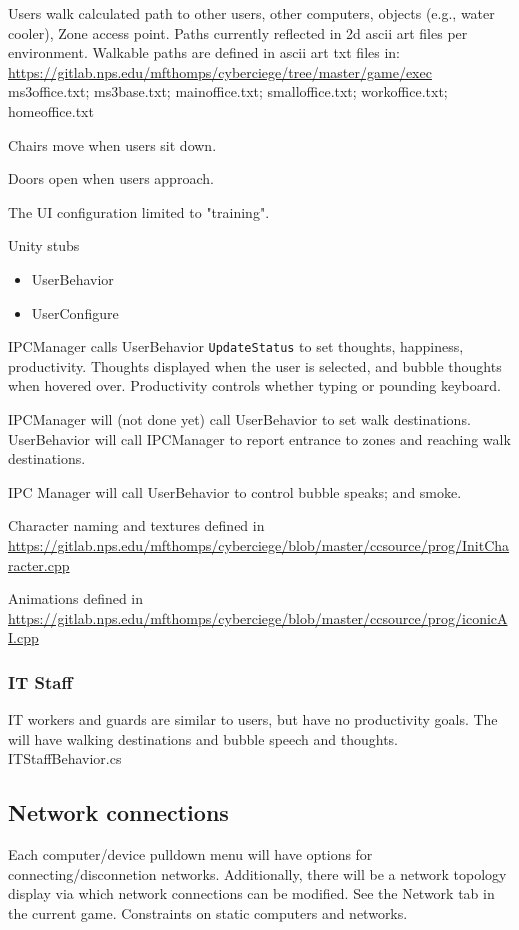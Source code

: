 \documentclass{article}
\begin{document}
Users walk calculated path to other users, other computers,
objects (e.g., water cooler), Zone access point.  Paths currently
reflected in 2d ascii art files per environment.
Walkable paths are defined in ascii art txt files in: \newline
\url{https://gitlab.nps.edu/mfthomps/cyberciege/tree/master/game/exec}
ms3office.txt; ms3base.txt; mainoffice.txt; smalloffice.txt; workoffice.txt; homeoffice.txt

Chairs move when users sit down.

Doors open when users approach.

The UI configuration limited to "training".

\noindent Unity stubs 
\begin{itemize}
\item UserBehavior
\item UserConfigure
\end{itemize}

IPCManager calls UserBehavior {\tt UpdateStatus} to set thoughts, happiness, productivity.  
Thoughts displayed when the user is selected, and bubble thoughts when hovered over.
Productivity controls whether typing or pounding keyboard.

IPCManager will (not done yet) call UserBehavior to set walk destinations.
UserBehavior will call IPCManager to report entrance to zones and reaching
walk destinations.

IPC Manager will call UserBehavior to control bubble speaks; and smoke.

Character naming and textures defined in \newline
\url{https://gitlab.nps.edu/mfthomps/cyberciege/blob/master/ccsource/prog/InitCharacter.cpp}

Animations defined in \newline
\url{https://gitlab.nps.edu/mfthomps/cyberciege/blob/master/ccsource/prog/iconicAI.cpp}

\subsubsection{IT Staff}
IT workers and guards are similar to users, but have no productivity goals. The will have walking 
destinations and bubble speech and thoughts.
ITStaffBehavior.cs

\subsection{Network connections}
Each computer/device pulldown menu will have options for connecting/disconnetion networks.
Additionally, there will be a network topology display via which network connections can
be modified.  See the Network tab in the current game.
Constraints on static computers and networks.
\end{document}
